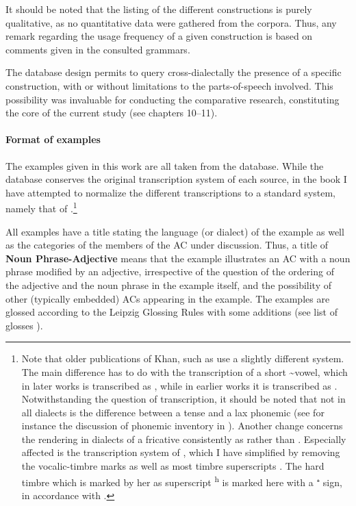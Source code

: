 It should be noted that the listing of the different constructions is purely qualitative, as no quantitative data were gathered from the corpora. Thus, any remark regarding the usage frequency of a given construction is based on comments given in the consulted grammars.

The database design permits to query cross-dialectally the presence of a specific construction, with or without limitations to the parts-of-speech involved. This possibility was invaluable for conducting the comparative research, constituting the core of the current study (see chapters 10--11). 

\paragraph*{Format of examples} \label{ss:examples_format}
The  examples given in this work are all taken from the database. While the database conserves the original transcription system of each source, in the book I have attempted to normalize the different transcriptions to a standard system, namely that of \citet{KhanBarwar, KhanSanandaj, KhanUrmi}.\footnote{Note that older publications of Khan, such as \citet{KhanArbel, KhanSulemaniyya} use a slightly different system. The main difference has to do with the transcription of a short \phonetic[ɪ]\~\phonetic[ə] vowel, which in later works is transcribed as , while in earlier works it is transcribed as .  Notwithstanding the question of transcription, it should be noted that not in all dialects is the difference between a tense \phonetic[i] and a lax \phonetic[ə] phonemic (see for instance the discussion of \Gaz phonemic inventory in \cite{GutmanGaznax}). Another change concerns the rendering in  dialects of a fricative \phonetic[θ] consistently as  rather than . Especially affected is the transcription system of \citet{YounansardaroudSardarid}, which I have simplified by removing the vocalic-timbre marks as well as most timbre superscripts \citep[cf.][20]{YounansardaroudSardarid}. The hard timbre which is marked by her as superscript \textsuperscript{h} is marked here with a ⁺ sign, in accordance with \citet{KhanUrmi}.}

 All examples have a title stating the language (or dialect) of the example as well as the categories of the members of the AC under discussion. Thus, a title of \textbf{Noun Phrase-Adjective} means that the example illustrates an AC with a noun phrase modified by an adjective, irrespective of the question of the ordering of the adjective and the noun phrase in the example itself, and the possibility of other (typically embedded) ACs appearing  in the example. The examples are glossed according to the Leipzig Glossing Rules \citep{LeipzigGlossingRules} with some additions (see list of glosses ). 
  
